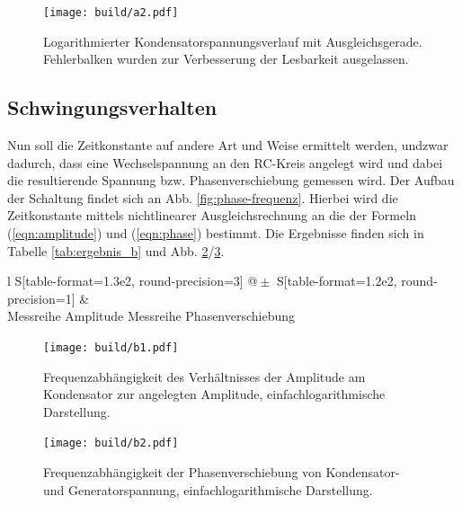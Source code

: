 \begin{figure}
  \centering
  \texttt{[image: build/a2.pdf]}
  \caption{Logarithmierter Kondensatorspannungsverlauf mit Ausgleichsgerade. Fehlerbalken wurden zur Verbesserung der Lesbarkeit ausgelassen.}
  \label{fig:auswertung_a}
\end{figure}

\subsection{Schwingungsverhalten}
\label{sec:b}
Nun soll die Zeitkonstante auf andere Art und Weise ermittelt werden, undzwar dadurch, dass eine Wechselspannung an den RC-Kreis angelegt wird und dabei die resultierende Spannung bzw. Phasenverschiebung gemessen wird. Der Aufbau der Schaltung findet sich an Abb. \ref{fig:phase-frequenz}. Hierbei wird die Zeitkonstante mittels nichtlinearer Ausgleichsrechnung an die der Formeln (\ref{eqn:amplitude}) und (\ref{eqn:phase}) bestimmt. Die Ergebnisse finden sich in Tabelle \ref{tab:ergebnis_b} und Abb. \ref{fig:auswertung_b1}/\ref{fig:auswertung_b2}.

\begin{table}
  \centering
  \caption{Ergebnis der Auswertung der Zeitkonstante des RC-Kreises.}
  \label{tab:ergebnis_b}
  \begin{tabular}{
    l
    S[table-format=1.3e2, round-precision=3] @{${}\pm{}$} S[table-format=1.2e2, round-precision=1]
  }
    \toprule
    &  \\
    \midrule
    Messreihe Amplitude 
    Messreihe Phasenverschiebung 
    \bottomrule
  \end{tabular}
\end{table}

\begin{figure}
  \centering
  \texttt{[image: build/b1.pdf]}
  \caption{Frequenzabhängigkeit des Verhältnisses der Amplitude am Kondensator zur angelegten Amplitude, einfachlogarithmische Darstellung.}
  \label{fig:auswertung_b1}
\end{figure}

\begin{figure}
  \centering
  \texttt{[image: build/b2.pdf]}
  \caption{Frequenzabhängigkeit der Phasenverschiebung von Kondensator- und Generatorspannung, einfachlogarithmische Darstellung.}
  \label{fig:auswertung_b2}
\end{figure}

